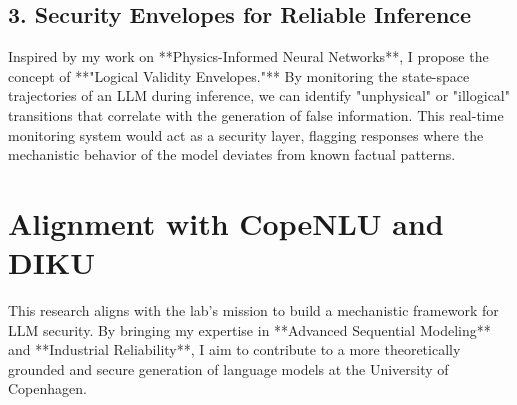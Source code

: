 \documentclass[11pt,a4paper]{article}
\begin{document}
\subsection{3. Security Envelopes for Reliable Inference}
Inspired by my work on **Physics-Informed Neural Networks**, I propose the concept of **"Logical Validity Envelopes."** By monitoring the state-space trajectories of an LLM during inference, we can identify "unphysical" or "illogical" transitions that correlate with the generation of false information. This real-time monitoring system would act as a security layer, flagging responses where the mechanistic behavior of the model deviates from known factual patterns.

\section{Alignment with CopeNLU and DIKU}
This research aligns with the lab's mission to build a mechanistic framework for LLM security. By bringing my expertise in **Advanced Sequential Modeling** and **Industrial Reliability**, I aim to contribute to a more theoretically grounded and secure generation of language models at the University of Copenhagen.
\end{document}
